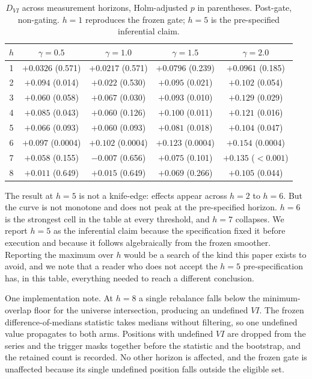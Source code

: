 \documentclass[12pt,letterpaper]{article}
\begin{document}
\begin{table}[htbp]
\centering
\caption{$D_{VI}$ across measurement horizons, Holm-adjusted $p$ in parentheses.
Post-gate, non-gating. $h = 1$ reproduces the frozen gate; $h = 5$ is the
pre-specified inferential claim.}
\label{tab:hsweep}
\small
\begin{tabular}{ccccc}
\toprule
$h$ & $\gamma = 0.5$ & $\gamma = 1.0$ & $\gamma = 1.5$ & $\gamma = 2.0$ \\
\midrule
1 & $+0.0326$ (0.571) & $+0.0217$ (0.571) & $+0.0796$ (0.239) & $+0.0961$ (0.185) \\
2 & $+0.094$ (0.014) & $+0.022$ (0.530) & $+0.095$ (0.021) & $+0.102$ (0.054) \\
3 & $+0.060$ (0.058) & $+0.067$ (0.030) & $+0.093$ (0.010) & $+0.129$ (0.029) \\
4 & $+0.085$ (0.043) & $+0.060$ (0.126) & $+0.100$ (0.011) & $+0.121$ (0.016) \\
5 & $+0.066$ (0.093) & $+0.060$ (0.093) & $+0.081$ (0.018) & $+0.104$ (0.047) \\
6 & $+0.097$ (0.0004) & $+0.102$ (0.0004) & $+0.123$ (0.0004) & $+0.154$ (0.0004) \\
7 & $+0.058$ (0.155) & $-0.007$ (0.656) & $+0.075$ (0.101) & $+0.135$ ($<0.001$) \\
8 & $+0.011$ (0.649) & $+0.015$ (0.649) & $+0.069$ (0.266) & $+0.105$ (0.044) \\
\bottomrule
\end{tabular}
\end{table}

The result at $h = 5$ is not a knife-edge: effects appear across $h = 2$ to $h = 6$. But
the curve is not monotone and does not peak at the pre-specified horizon. $h = 6$ is the
strongest cell in the table at every threshold, and $h = 7$ collapses. We report $h = 5$
as the inferential claim because the specification fixed it before execution and because
it follows algebraically from the frozen smoother. Reporting the maximum over $h$ would
be a search of the kind this paper exists to avoid, and we note that a reader who does
not accept the $h = 5$ pre-specification has, in this table, everything needed to reach a
different conclusion.

One implementation note. At $h = 8$ a single rebalance falls below the minimum-overlap
floor for the universe intersection, producing an undefined $VI$. The frozen
difference-of-medians statistic takes medians without filtering, so one undefined value
propagates to both arms. Positions with undefined $VI$ are dropped from the series and
the trigger masks together before the statistic and the bootstrap, and the retained count
is recorded. No other horizon is affected, and the frozen gate is unaffected because its
single undefined position falls outside the eligible set.
\end{document}
